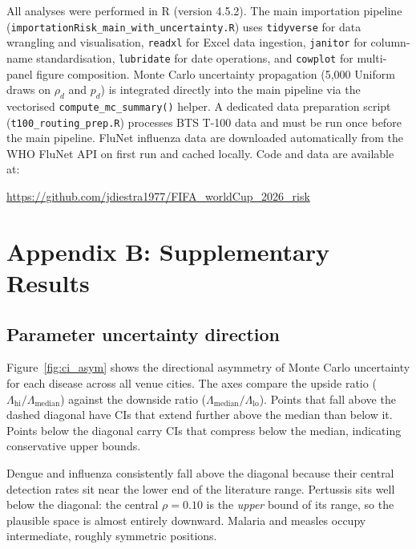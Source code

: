 \documentclass[12pt]{article}
\begin{document}
All analyses were performed in R (version 4.5.2). The main
importation pipeline
(\texttt{importationRisk\_main\_with\_uncertainty.R}) uses
\texttt{tidyverse} for data wrangling and visualisation,
\texttt{readxl} for Excel data ingestion, \texttt{janitor} for
column-name standardisation, \texttt{lubridate} for date operations,
and \texttt{cowplot} for multi-panel figure composition. Monte Carlo
uncertainty propagation (5,000 Uniform draws on $\rho_d$ and $p_d$)
is integrated directly into the main pipeline via the vectorised
\texttt{compute\_mc\_summary()} helper. A dedicated data preparation
script (\texttt{t100\_routing\_prep.R}) processes BTS T-100 data and
must be run once before the main pipeline. FluNet influenza data are
downloaded automatically from the WHO FluNet API on first run and
cached locally. Code and data are available at:
{\sloppy\begin{center}
\small\url{https://github.com/jdiestra1977/FIFA_worldCup_2026_risk}
\end{center}}

\section*{Appendix B: Supplementary Results}

\subsection*{Parameter uncertainty direction}

Figure~\ref{fig:ci_asym} shows the directional asymmetry of Monte
Carlo uncertainty for each disease across all venue cities. The axes
compare the upside ratio ($\Lambda_\text{hi} / \Lambda_\text{median}$)
against the downside ratio ($\Lambda_\text{median} / \Lambda_\text{lo}$).
Points that fall above the dashed diagonal have CIs that extend further
above the median than below it. Points below the diagonal carry CIs
that compress below the median, indicating conservative upper bounds.

Dengue and influenza consistently fall above the diagonal because their
central detection rates sit near the lower end of the literature range.
Pertussis sits well below the diagonal: the central $\rho = 0.10$ is the
\emph{upper} bound of its range, so the plausible space is almost
entirely downward. Malaria and measles occupy intermediate, roughly
symmetric positions.
\end{document}
